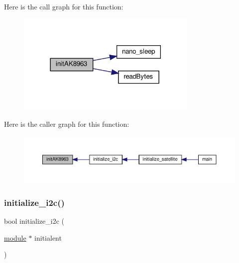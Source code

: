 Here is the call graph for this function\+:\nopagebreak
\begin{figure}[H]
\begin{center}
\leavevmode
\includegraphics[width=246pt]{i2c-interface_8c_a70fbb9dd53a39541d7f04140a2c63f3f_cgraph}
\end{center}
\end{figure}
Here is the caller graph for this function\+:\nopagebreak
\begin{figure}[H]
\begin{center}
\leavevmode
\includegraphics[width=350pt]{i2c-interface_8c_a70fbb9dd53a39541d7f04140a2c63f3f_icgraph}
\end{center}
\end{figure}
\mbox{\label{i2c-interface_8c_a8eb11c031b9484a01fd8b263c13373cf}} 
\subsubsection{\texorpdfstring{initialize\+\_\+i2c()}{initialize\_i2c()}}
{\footnotesize\ttfamily bool initialize\+\_\+i2c (\begin{DoxyParamCaption}\item[{\hyperlink{structmodule}{module} $\ast$}]{initialent }\end{DoxyParamCaption})}

